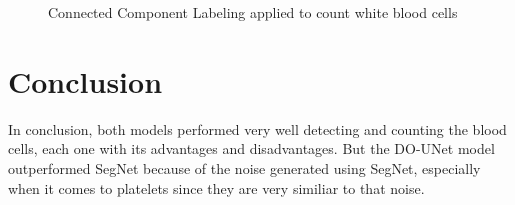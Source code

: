 \begin{figure}[H]
\centering
\begin{minipage}{.5\textwidth}
  \centering
\end{minipage}%
\begin{minipage}{.5\textwidth}
  \centering
\end{minipage}
  \caption{Connected Component Labeling applied to count white blood cells}
  \label{fig:ccl_output}
\end{figure}

\vspace{-0.1in}

\section{Conclusion}
In conclusion, both models performed very well detecting and counting the blood cells, each one with its advantages and disadvantages.
But the DO-UNet model outperformed SegNet because of the noise generated using SegNet, especially when it comes to platelets since they are very similiar to that noise.

\newpage
